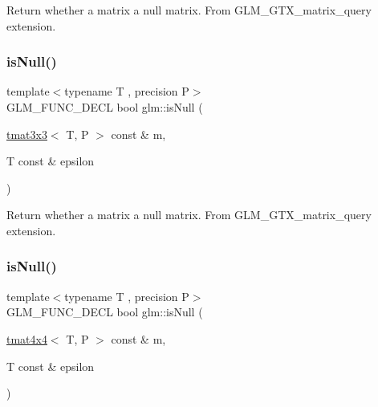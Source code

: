 Return whether a matrix a null matrix. From G\+L\+M\+\_\+\+G\+T\+X\+\_\+matrix\+\_\+query extension. \mbox{\label{group__gtx__matrix__query_gac67a5c7e029a84b74b02ac9599b8972d}} 
\subsubsection{\texorpdfstring{is\+Null()}{isNull()}\hspace{0.1cm}{\footnotesize\ttfamily [2/3]}}
{\footnotesize\ttfamily template$<$typename T , precision P$>$ \\
G\+L\+M\+\_\+\+F\+U\+N\+C\+\_\+\+D\+E\+CL bool glm\+::is\+Null (\begin{DoxyParamCaption}\item[{\hyperlink{structglm_1_1tmat3x3}{tmat3x3}$<$ T, P $>$ const \&}]{m,  }\item[{T const \&}]{epsilon }\end{DoxyParamCaption})}

Return whether a matrix a null matrix. From G\+L\+M\+\_\+\+G\+T\+X\+\_\+matrix\+\_\+query extension. \mbox{\label{group__gtx__matrix__query_ga326de496972051413c7b44b85fc9cb6e}} 
\subsubsection{\texorpdfstring{is\+Null()}{isNull()}\hspace{0.1cm}{\footnotesize\ttfamily [3/3]}}
{\footnotesize\ttfamily template$<$typename T , precision P$>$ \\
G\+L\+M\+\_\+\+F\+U\+N\+C\+\_\+\+D\+E\+CL bool glm\+::is\+Null (\begin{DoxyParamCaption}\item[{\hyperlink{structglm_1_1tmat4x4}{tmat4x4}$<$ T, P $>$ const \&}]{m,  }\item[{T const \&}]{epsilon }\end{DoxyParamCaption})}

